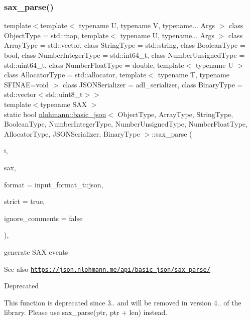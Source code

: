 \subsubsection{\texorpdfstring{sax\+\_\+parse()}{sax\_parse()}\hspace{0.1cm}{\footnotesize\ttfamily [3/3]}}
{\footnotesize\ttfamily template$<$template$<$ typename U, typename V, typename... Args $>$ class Object\+Type = std\+::map, template$<$ typename U, typename... Args $>$ class Array\+Type = std\+::vector, class String\+Type  = std\+::string, class Boolean\+Type  = bool, class Number\+Integer\+Type  = std\+::int64\+\_\+t, class Number\+Unsigned\+Type  = std\+::uint64\+\_\+t, class Number\+Float\+Type  = double, template$<$ typename U $>$ class Allocator\+Type = std\+::allocator, template$<$ typename T, typename S\+F\+I\+N\+A\+E=void $>$ class J\+S\+O\+N\+Serializer = adl\+\_\+serializer, class Binary\+Type  = std\+::vector$<$std\+::uint8\+\_\+t$>$$>$ \\
template$<$typename S\+AX $>$ \\
static bool \hyperlink{classnlohmann_1_1basic__json}{nlohmann\+::basic\+\_\+json}$<$ Object\+Type, Array\+Type, String\+Type, Boolean\+Type, Number\+Integer\+Type, Number\+Unsigned\+Type, Number\+Float\+Type, Allocator\+Type, J\+S\+O\+N\+Serializer, Binary\+Type $>$\+::sax\+\_\+parse (\begin{DoxyParamCaption}\item[{\hyperlink{classnlohmann_1_1detail_1_1span__input__adapter}{detail\+::span\+\_\+input\+\_\+adapter} \&\&}]{i,  }\item[{S\+AX $\ast$}]{sax,  }\item[{\hyperlink{namespacenlohmann_1_1detail_aa554fc6a11519e4f347deb25a9f0db40}{input\+\_\+format\+\_\+t}}]{format = {\ttfamily input\+\_\+format\+\_\+t\+:\+:json},  }\item[{const bool}]{strict = {\ttfamily true},  }\item[{const bool}]{ignore\+\_\+comments = {\ttfamily false} }\end{DoxyParamCaption})\hspace{0.3cm}{\ttfamily [inline]}, {\ttfamily [static]}}



generate S\+AX events 

\begin{DoxySeeAlso}{See also}
\href{https://json.nlohmann.me/api/basic_json/sax_parse/}{\tt https\+://json.\+nlohmann.\+me/api/basic\+\_\+json/sax\+\_\+parse/} 
\end{DoxySeeAlso}
\begin{DoxyRefDesc}{Deprecated}
\item[\hyperlink{deprecated__deprecated000004}{Deprecated}]This function is deprecated since 3.. and will be removed in version 4.. of the library. Please use sax\+\_\+parse(ptr, ptr + len) instead. \end{DoxyRefDesc}
\mbox{\label{classnlohmann_1_1basic__json_a33c7c8638bb0b12e6d1b69d8106dd2e0}} 
